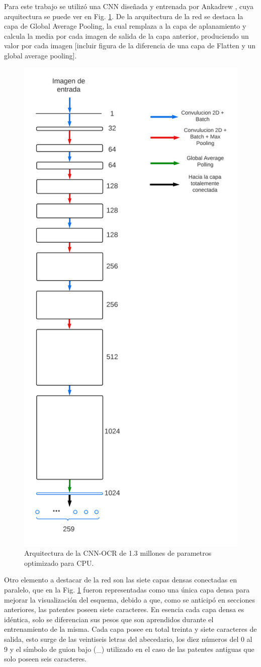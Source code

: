 Para este trabajo se utilizó una CNN diseñada y entrenada por Ankadrew \cite{ankandrew_reconocedor_2023}, cuya arquitectura se puede ver en Fig. \ref{fig:arquitectura-cnn-ocr}. De la arquitectura de la red se destaca la capa de Global Average Pooling, la cual remplaza a la capa de aplanamiento y calcula la media por cada imagen de salida de la capa anterior, produciendo un valor por cada imagen [incluir figura de la diferencia de una capa de Flatten y un global average pooling].
\begin{figure}[bth]
    \centering
    \includegraphics[width=.4\textwidth]{imgs/cnn-ocr.png}
    \caption{Arquitectura de la CNN-OCR de 1.3 millones de parametros optimizado para CPU.}
    \label{fig:arquitectura-cnn-ocr}
\end{figure}

Otro elemento a destacar de la red son las siete capas densas conectadas en paralelo, que en la Fig. \ref{fig:arquitectura-cnn-ocr} fueron representadas como una única capa densa para mejorar la visualización del esquema, debido a que, como se anticipó en secciones anteriores, las patentes poseen siete caracteres. En esencia cada capa densa es idéntica, solo se diferencian sus pesos que son aprendidos durante el entrenamiento de la misma. Cada capa posee en total treinta y siete caracteres de salida, esto surge de las veintiseis letras del abecedario, los diez números del 0 al 9 y el símbolo de guion bajo (\_) utilizado en el caso de las patentes antiguas que solo poseen seis caracteres.


